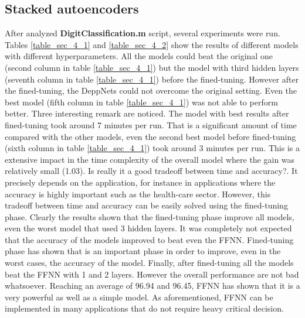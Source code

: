 \subsection{Stacked autoencoders}
After analyzed \textbf{DigitClassification.m} script, several experiments were run. Tables \ref{table_sec_4_1} and \ref{table_sec_4_2} show the results of different models with different hyperparameters.
\bigbreak
All the models could beat the original one (second column in table \ref{table_sec_4_1}) but the model with third hidden layers (seventh column in table \ref{table_sec_4_1}) before the fined-tuning. However after the fined-tuning, the DeppNets could not overcome the original setting. Even the best model (fifth column in table \ref{table_sec_4_1}) was not able to perform better.
\bigbreak
Three interesting remark are noticed. The model with best results after fined-tuning took around 7 minutes per run. That is a significant amount of time compared with the other models, even the second best model before fined-tuning (sixth column in table \ref{table_sec_4_1}) took around 3 minutes per run. This is a extensive impact in the time complexity of the overall model where the gain was relatively small (1.03). Is really it a good tradeoff between time and accuracy?. It precisely depends on the application, for instance in applications where the accuracy is highly important such as the health-care sector.
\bigbreak
However, this tradeoff between time and accuracy can be easily solved using the fined-tuning phase. Clearly the results shown that the fined-tuning phase improve all models, even the worst model that used 3 hidden layers. It was completely not expected that the accuracy of the models improved to beat even the FFNN. Fined-tuning phase has shown that is an important phase in order to improve, even in the worst cases, the accuracy of the model.
\bigbreak
Finally, after fined-tuning all the models beat the FFNN with 1 and 2 layers. However the overall performance are not bad whatsoever. Reaching an average of 96.94 and 96.45, FFNN has shown that it is a very powerful as well as a simple model. As aforementioned, FFNN can be implemented in many applications that do not require heavy critical decision.
